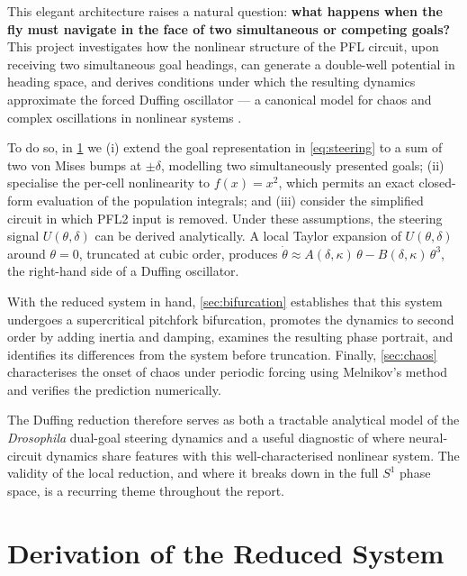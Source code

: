 \documentclass[11pt, a4paper]{article}
\begin{document}
This elegant architecture raises a natural question: \textbf{what happens when the fly
must navigate in the face of two simultaneous or competing goals?}  This project
investigates how the nonlinear structure of the PFL circuit, upon receiving two
simultaneous goal headings, can generate a double-well potential in heading
space, and derives conditions under which the resulting dynamics approximate the
forced Duffing oscillator --- a canonical model for chaos and complex
oscillations in nonlinear systems \cite{guckenheimer1983}.

To do so, in \cref{sec:derivation} we (i) extend the goal representation in
\cref{eq:steering} to a sum of two von Mises bumps at $\pm\delta$, modelling
two simultaneously presented goals; (ii) specialise the per-cell nonlinearity
to $f(x) = x^2$, which permits an exact closed-form evaluation of the
population integrals; and (iii) consider the simplified circuit in which PFL2
input is removed.  Under these assumptions, the steering signal
$U(\theta, \delta)$ can be derived analytically.  A local Taylor expansion of
$U(\theta, \delta)$ around $\theta = 0$, truncated at cubic order, produces
$\dot\theta \approx A(\delta,\kappa)\,\theta - B(\delta,\kappa)\,\theta^3$, the
right-hand side of a Duffing oscillator.

With the reduced system in hand, \cref{sec:bifurcation} establishes that this
system undergoes a supercritical pitchfork bifurcation, promotes the dynamics to
second order by adding inertia and damping, examines the resulting phase portrait,
and identifies its differences from the system before truncation.  Finally,
\cref{sec:chaos} characterises the onset of chaos under periodic forcing using
Melnikov's method and verifies the prediction numerically.

The Duffing reduction therefore serves as both a tractable analytical model of
the \textit{Drosophila} dual-goal steering dynamics and a useful diagnostic of
where neural-circuit dynamics share features with this well-characterised
nonlinear system.  The validity of the local reduction, and where it breaks down
in the full $S^1$ phase space, is a recurring theme throughout the report.


\section{Derivation of the Reduced System}
\label{sec:derivation}
\end{document}
